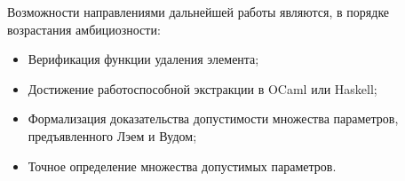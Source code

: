 \documentclass[a4paper,14pt]{extarticle}
\begin{document}
Возможности направлениями дальнейшей работы являются,
в порядке возрастания амбициозности:
\begin{itemize}
  \item Верификация функции удаления элемента;
  \item Достижение работоспособной экстракции в OCaml или Haskell;
  \item Формализация доказательства допустимости множества параметров,
    предъявленного Лэем и Вудом;
  \item Точное определение множества допустимых параметров.
\end{itemize}

\clearpage
{}
\printbibliography[heading=none]
\end{document}
